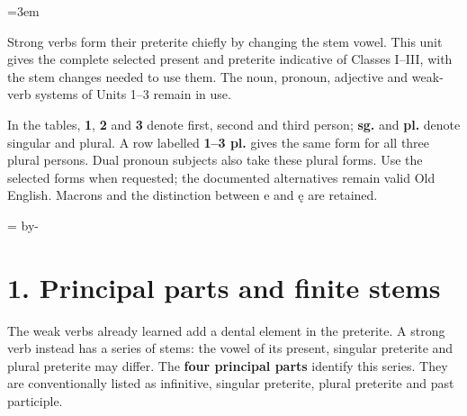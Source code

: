 \newcommand{\runningtitle}{Unit 4. Strong verbs I–III}

\emergencystretch=3em
\newcommand{\itempara}[2]{\par\addvspace{3pt}\noindent\hangindent=1.8em\hangafter=1\makebox[1.8em][l]{#1.}#2\par}
\newcommand{\reserve}[1]{\par\penalty-100\begingroup\dimen0=\pagegoal\advance\dimen0 by-\pagetotal\ifdim\dimen0<#1\newpage\fi\endgroup}

\raggedright
{}

Strong verbs form their preterite chiefly by changing the stem vowel. This unit gives the complete selected present and preterite indicative of Classes I–III, with the stem changes needed to use them. The noun, pronoun, adjective and weak-verb systems of Units 1–3 remain in use.

In the tables, \textbf{1}, \textbf{2} and \textbf{3} denote first, second and third person; \textbf{sg.} and \textbf{pl.} denote singular and plural. A row labelled \textbf{1–3 pl.} gives the same form for all three plural persons. Dual pronoun subjects also take these plural forms. Use the selected forms when requested; the documented alternatives remain valid Old English. Macrons and the distinction between e and ę are retained.

\reserve{7\baselineskip}
\section*{1. Principal parts and finite stems}

The weak verbs already learned add a dental element in the preterite. A strong verb instead has a series of stems: the vowel of its present, singular preterite and plural preterite may differ. The \textbf{four principal parts} identify this series. They are conventionally listed as infinitive, singular preterite, plural preterite and past participle.

